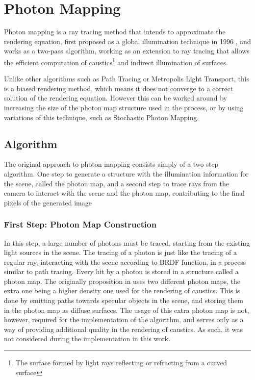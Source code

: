 \documentclass[main.tex]{subfiles}
\begin{document}
\section{Photon Mapping} \label{section:pm}


Photon mapping is a ray tracing method that intends to approximate the rendering equation, first proposed as a global illumination technique in 1996 \cite{jensen1996global}, and works as a two-pass algorithm, working as an extension to ray tracing that allows the efficient computation of caustics\footnote{The surface formed by light rays reflecting or refracting from a curved surface} and indirect illumination of surfaces.

Unlike other algorithms such as Path Tracing or Metropolis Light Transport, this is a biased rendering method, which means it does not converge to a correct solution of the rendering equation. However this can be worked around by increasing the size of the photon map structure used in the process, or by using variations of this technique, such as Stochastic Photon Mapping.

\subsection{Algorithm}

The original approach to photon mapping consists simply of a two step algorithm. One step to generate a structure with the illumination information for the scene, called the photon map, and a second step to trace rays from the camera to interact with the scene and the photon map, contributing to the final pixels of the generated image

\subsubsection{First Step: Photon Map Construction}

In this step, a large number of photons must be traced, starting from the existing light sources in the scene. The tracing of a photon is just like the tracing of a regular ray, interacting with the scene according to \acs{BRDF} function, in a process similar to path tracing. Every hit by a photon is stored in a structure called a photon map.
The originally proposition in \cite{jensen1996global} uses two different photon maps, the extra one being a higher density one used for the rendering of caustics. This is done by emitting paths towards specular objects in the scene, and storing them in the photon map as diffuse surfaces.
The usage of this extra photon map is not, however, required for the implementation of the algorithm, and serves only as a way of providing additional quality in the rendering of caustics. As such, it was not considered during the implementation in this work.
\end{document}
